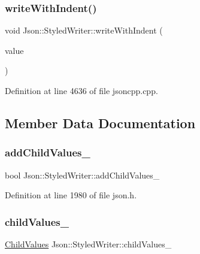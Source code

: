 \subsubsection{\texorpdfstring{write\+With\+Indent()}{writeWithIndent()}\hspace{0.1cm}{\footnotesize\ttfamily [2/2]}}
{\footnotesize\ttfamily void Json\+::\+Styled\+Writer\+::write\+With\+Indent (\begin{DoxyParamCaption}\item[{const \hyperlink{config_8h_a1e723f95759de062585bc4a8fd3fa4be}{J\+S\+O\+N\+C\+P\+P\+\_\+\+S\+T\+R\+I\+NG} \&}]{value }\end{DoxyParamCaption})\hspace{0.3cm}{\ttfamily [private]}}



Definition at line 4636 of file jsoncpp.\+cpp.



\subsection{Member Data Documentation}
\hypertarget{class_json_1_1_styled_writer_acaabfa48b50a8bb7fa9ce98e2ae971d9}{}\label{class_json_1_1_styled_writer_acaabfa48b50a8bb7fa9ce98e2ae971d9} 
\subsubsection{\texorpdfstring{add\+Child\+Values\+\_\+}{addChildValues\_}}
{\footnotesize\ttfamily bool Json\+::\+Styled\+Writer\+::add\+Child\+Values\+\_\+\hspace{0.3cm}{\ttfamily [private]}}



Definition at line 1980 of file json.\+h.

\hypertarget{class_json_1_1_styled_writer_a1f905495f0705365af117ec541e29fdf}{}\label{class_json_1_1_styled_writer_a1f905495f0705365af117ec541e29fdf} 
\subsubsection{\texorpdfstring{child\+Values\+\_\+}{childValues\_}}
{\footnotesize\ttfamily \hyperlink{class_json_1_1_styled_writer_a798fcefa41730de612a5cf7e73003e8a}{Child\+Values} Json\+::\+Styled\+Writer\+::child\+Values\+\_\+\hspace{0.3cm}{\ttfamily [private]}}



